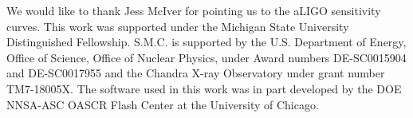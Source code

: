 \documentclass[twocolumn,times]{aastex62}  %
\begin{document}
\acknowledgements

We would like to thank Jess McIver for pointing us to the aLIGO sensitivity curves.  This work was supported under the Michigan State University Distinguished Fellowship. 
S.M.C. is supported by the U.S. Department of Energy, Office of Science, Office of Nuclear Physics,
under Award numbers DE-SC0015904 and DE-SC0017955 and the Chandra
X-ray Observatory under grant number TM7-18005X.
The software used in this
work was in part developed by the DOE NNSA-ASC OASCR Flash Center at
the University of Chicago.  

    





\end{document}
